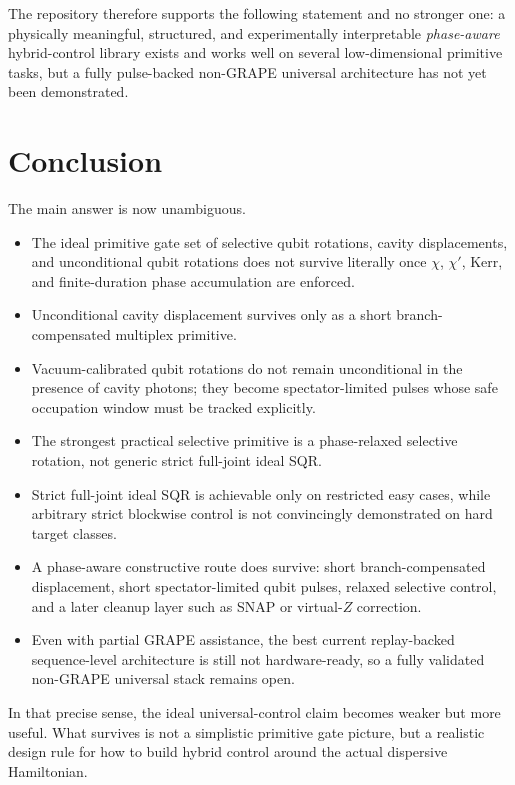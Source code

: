 \documentclass[11pt]{article}
\begin{document}
The repository therefore supports the following statement and no stronger one: a physically meaningful, structured, and experimentally interpretable \emph{phase-aware} hybrid-control library exists and works well on several low-dimensional primitive tasks, but a fully pulse-backed non-GRAPE universal architecture has not yet been demonstrated.

\section{Conclusion}

The main answer is now unambiguous.

\begin{itemize}
\item The ideal primitive gate set of selective qubit rotations, cavity displacements, and unconditional qubit rotations does not survive literally once $\chi$, $\chi'$, Kerr, and finite-duration phase accumulation are enforced.
\item Unconditional cavity displacement survives only as a short branch-compensated multiplex primitive.
\item Vacuum-calibrated qubit rotations do not remain unconditional in the presence of cavity photons; they become spectator-limited pulses whose safe occupation window must be tracked explicitly.
\item The strongest practical selective primitive is a phase-relaxed selective rotation, not generic strict full-joint ideal SQR.
\item Strict full-joint ideal SQR is achievable only on restricted easy cases, while arbitrary strict blockwise control is not convincingly demonstrated on hard target classes.
\item A phase-aware constructive route does survive: short branch-compensated displacement, short spectator-limited qubit pulses, relaxed selective control, and a later cleanup layer such as SNAP or virtual-$Z$ correction.
\item Even with partial GRAPE assistance, the best current replay-backed sequence-level architecture is still not hardware-ready, so a fully validated non-GRAPE universal stack remains open.
\end{itemize}

In that precise sense, the ideal universal-control claim becomes weaker but more useful. What survives is not a simplistic primitive gate picture, but a realistic design rule for how to build hybrid control around the actual dispersive Hamiltonian.
\end{document}
